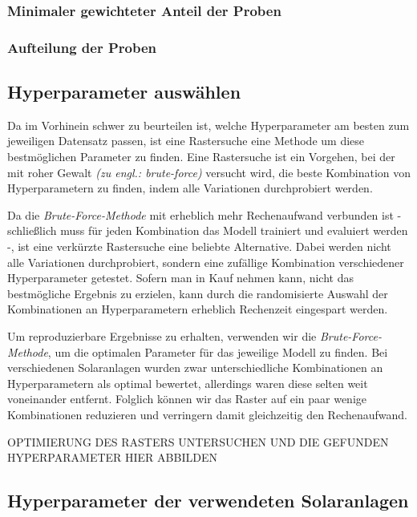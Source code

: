 \documentclass[12pt, a4paper]{article}
\begin{document}
\subsubsection{Minimaler gewichteter Anteil der Proben}

\subsubsection{Aufteilung der Proben}

\subsection{Hyperparameter auswählen}

Da im Vorhinein schwer zu beurteilen ist, welche Hyperparameter am besten zum jeweiligen Datensatz passen, ist eine Rastersuche eine Methode um diese bestmöglichen Parameter zu finden. Eine Rastersuche ist ein Vorgehen, bei der mit roher Gewalt \textit{(zu engl.: brute-force)} versucht wird, die beste Kombination von Hyperparametern zu finden, indem alle Variationen durchprobiert werden.

Da die \textit{Brute-Force-Methode} mit erheblich mehr Rechenaufwand verbunden ist - schließlich muss für jeden Kombination das Modell trainiert und evaluiert werden -, ist eine verkürzte Rastersuche eine beliebte Alternative. Dabei werden nicht alle Variationen durchprobiert, sondern eine zufällige Kombination verschiedener Hyperparameter getestet. Sofern man in Kauf nehmen kann, nicht das bestmögliche Ergebnis zu erzielen, kann durch die randomisierte Auswahl der Kombinationen an Hyperparametern erheblich Rechenzeit eingespart werden.

Um reproduzierbare Ergebnisse zu erhalten, verwenden wir die \textit{Brute-Force-Methode}, um die optimalen Parameter für das jeweilige Modell zu finden. Bei verschiedenen Solaranlagen wurden zwar unterschiedliche Kombinationen an Hyperparametern als optimal bewertet, allerdings waren diese selten weit voneinander entfernt. Folglich können wir das Raster auf ein paar wenige Kombinationen reduzieren und verringern damit gleichzeitig den Rechenaufwand.

OPTIMIERUNG DES RASTERS UNTERSUCHEN UND DIE GEFUNDEN HYPERPARAMETER HIER ABBILDEN

\subsection{Hyperparameter der verwendeten Solaranlagen}
\end{document}
